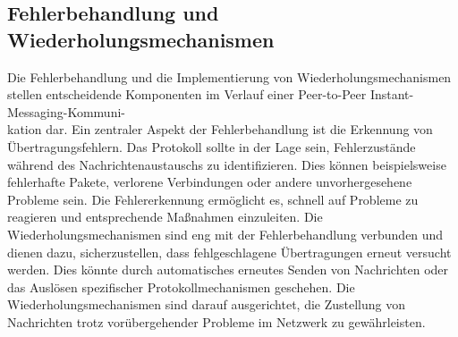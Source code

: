\subsection{Fehlerbehandlung und Wiederholungsmechanismen}

Die Fehlerbehandlung und die Implementierung von Wiederholungsmechanismen stellen entscheidende Komponenten im Verlauf einer Peer-to-Peer Instant-Messaging-Kommuni-\\kation dar. Ein zentraler Aspekt der Fehlerbehandlung ist die Erkennung von Übertragungsfehlern. Das Protokoll sollte in der Lage sein, Fehlerzustände während des Nachrichtenaustauschs zu identifizieren. Dies können beispielsweise fehlerhafte Pakete, verlorene Verbindungen oder andere unvorhergesehene Probleme sein. Die Fehlererkennung ermöglicht es, schnell auf Probleme zu reagieren und entsprechende Maßnahmen einzuleiten. Die Wiederholungsmechanismen sind eng mit der Fehlerbehandlung verbunden und dienen dazu, sicherzustellen, dass fehlgeschlagene Übertragungen erneut versucht werden. Dies könnte durch automatisches erneutes Senden von Nachrichten oder das Auslösen spezifischer Protokollmechanismen geschehen. Die Wiederholungsmechanismen sind darauf ausgerichtet, die Zustellung von Nachrichten trotz vorübergehender Probleme im Netzwerk zu gewährleisten.